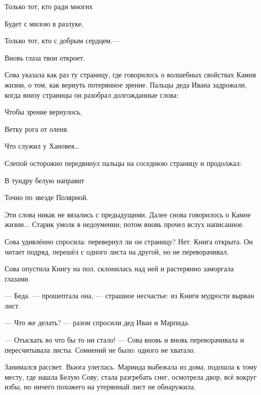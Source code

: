\documentclass[oneside,final,14pt]{extreport}
\begin{document}
	
	
	
\qquad \qquad \qquad \qquad 	Только тот, кто ради многих
	
\qquad \qquad \qquad \qquad 	Будет с милою в разлуке,
	
\qquad \qquad \qquad \qquad 	Только тот, кто с добрым сердцем.—
	
\qquad \qquad \qquad \qquad 	Вновь глаза твои откроет.
	
	
	
	
	Сова указала как раз ту страницу, где говорилось о волшебных свойствах Камня жизни, о том, как вернуть потерянное зрение. Пальцы деда Ивана задрожали, когда внизу страницы он разобрал долгожданные слова: 
	
	
	
	
\qquad \qquad \qquad \qquad 	Чтобы зрение вернулось,
	
\qquad \qquad \qquad \qquad 	Ветку рога от оленя.
	
\qquad \qquad \qquad \qquad 	Что служил у Хановея…
	
	
	
	
	Слепой осторожно передвинул пальцы на соседнюю страницу и продолжал:
	
	
	
	
\qquad \qquad \qquad \qquad 	В тундру белую направит
	
\qquad \qquad \qquad \qquad 	Точно по звезде Полярной.
	
	
	
	
	Эти слова никак не вязались с предыдущими. Далее снова говорилось о Камне жизни... Старик умолк в недоумении; потом вновь прочел вслух написанное.
	
	Сова удивлённо спросила: перевернул ли он страницу? Нет. Книга открыта. Он читает подряд, перешёл с одного листа на другой, но не переворачивал.
	
	Сова опустила Книгу на пол, склонилась над ней и растерянно заморгала глазами.
	
	— Беда. — прошептала она, — страшное несчастье: из Книги мудрости вырван лист.
	
	— Что же делать? — разом спросили дед Иван и Марпида.
	
	— Отыскать во что бы то ни стало! — Сова вновь и вновь переворачивала и пересчитывала листы. Сомнений не было: одного не хватало.
	
	Занимался рассвет. Вьюга улеглась. Мариида выбежала из дома, подошла к тому месту, где нашла Белую Сову; стала разгребать снег, осмотрела двор, всё вокруг избы, но ничего похожего на утерянный лист не обнаружила.
	
\end{document}
